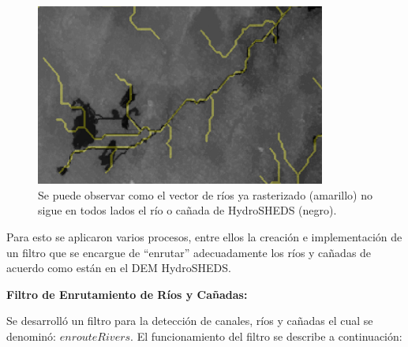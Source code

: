 \documentclass[10pt,a4paper, twoside]{report}
\begin{document}
\begin{figure}[H]
   \centering      
   \includegraphics[width=0.85\textwidth]{imagenes/riverToEnroute.jpg}
 \caption{Se puede observar como el vector de ríos ya rasterizado (amarillo) no sigue en todos lados el río o cañada de HydroSHEDS (negro).}
 \label{riverToEnroute}
\end{figure}

Para esto se aplicaron varios procesos, entre ellos la creación e implementación de un filtro que se encargue de "`enrutar"' adecuadamente los ríos y cañadas de acuerdo como están en el DEM HydroSHEDS. 

\textbf{Filtro de Enrutamiento de Ríos y Cañadas:} 

Se desarrolló un filtro para la detección de canales, ríos y cañadas el cual se denominó: $enrouteRivers$. El funcionamiento del filtro se describe a continuación:
\end{document}
